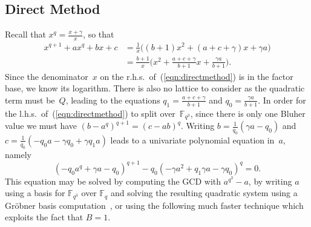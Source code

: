 \documentclass[11pt]{llncs}
\newcommand{\F}{\mathbb F}
\begin{document}
\subsection{Direct Method}

Recall that $x^q = \frac {x + \gamma} x$, so that
\begin{align}\label{eqn:directmethod}
  x^{q+1} + a x^q + b x + c &= \tfrac 1 x \big( (b + 1) x^2 + (a + c + \gamma) x + \gamma a \big) \\
  \nonumber &= \frac {b + 1} x \bigg( x^2 + \frac {a + c + \gamma} {b + 1} x + \frac {\gamma a} {b + 1} \bigg) .
\end{align}
Since the denominator~$x$ on the r.h.s.\ of~(\ref{eqn:directmethod}) is in the factor base, we know its logarithm. There is also no lattice 
to consider as the quadratic term must be~$Q$, leading to the equations $q_1 = \frac {a + c + \gamma} {b+1}$ and $q_0 = \frac {\gamma a} {b+1}$. 
In order for the l.h.s.\ of~(\ref{eqn:directmethod}) to split over~$\F_{q^3}$, since there is only one Bluher value we must have 
$(b - a^q)^{q+1} = (c - a b)^q$. 
Writing $b = \frac 1 {q_0} (\gamma a - q_0)$ and $c = \frac 1 {q_0} (-q_0 a - \gamma q_0 + \gamma q_1 a)$ leads to a 
univariate polynomial equation in~$a$, namely
\[ (-q_0 a^q + \gamma a - q_0)^{q+1} - q_0 (-\gamma a^2 + q_1 \gamma a - \gamma q_0)^q = 0. \]
This equation may be solved by computing the GCD with $a^{q^3} - a$, by writing $a$ using a basis for $\F_{q^3}$ over $\F_q$ and solving 
the resulting quadratic system using a Gr\"obner basis computation~\cite{GGMZ13b}, or using the following much faster technique which exploits the 
fact that $B = 1$. 
\end{document}
